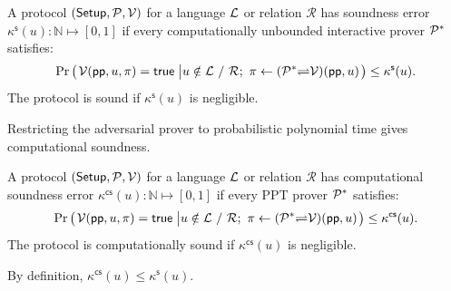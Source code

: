 \begin{definition}
	\label{def:soundness}
	A protocol $({\sf Setup},\mathcal{P},\mathcal{V})$ for a language
    $\mathcal{L}$ or relation $\mathcal R$ has soundness error
    $\kappa^\mathsf{s}(u)\colon\mathbb N\mapsto[0,1]$ if every
    computationally unbounded interactive prover $\mathcal{P}^*$ satisfies:
	\begin{equation*}
	\Pr
		\left(
			\left.
			\begin{aligned}
				& \mathcal{V}({\sf pp}, u, \pi) = {\sf true} \\
			\end{aligned}
			\right.
			\left|
			\begin{aligned}
				& u \notin \mathcal{L}~/~ \mathcal{R};~ \pi \leftarrow (\mathcal{P}^* {\rightleftharpoons} \mathcal{V}) ({\sf pp}, u) \\
			\end{aligned}
			\right.
		\right)
	\le \kappa^\mathsf{s}(u).
	\end{equation*}
    The protocol is sound if $\kappa^\mathsf{s}(u)$ is negligible.
\end{definition}

Restricting the adversarial prover to probabilistic polynomial time
gives computational soundness.
\begin{definition}
	\label{def:ComputationalSoundness}
	A protocol $({\sf Setup},\mathcal{P},\mathcal{V})$ for a language
    $\mathcal{L}$ or relation $\mathcal R$ has computational soundness
    error $\kappa^\mathsf{cs}(u)\colon\mathbb N\mapsto[0,1]$ if
    every PPT prover $\mathcal{P}^*$ satisfies:
	\begin{equation*}
	\Pr
		\left(
			\left.
			\begin{aligned}
				& \mathcal{V}({\sf pp}, u, \pi) = {\sf true} \\
			\end{aligned}
			\right.
			\left|
			\begin{aligned}
				& u \notin \mathcal{L}~/~\mathcal{R};~ \pi \leftarrow (\mathcal{P}^* {\rightleftharpoons} \mathcal{V})({\sf pp}, u) \\
			\end{aligned}
			\right.
		\right)
	\le \kappa^\mathsf{cs}(u).
	\end{equation*}
    The protocol is computationally sound if
    $\kappa^\mathsf{cs}(u)$ is negligible.
\end{definition}
By definition, $\kappa^\mathsf{cs}(u)\leq\kappa^\mathsf{s}(u)$.

